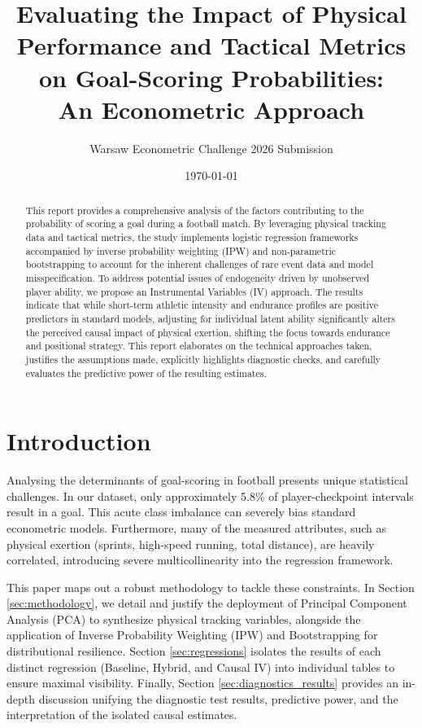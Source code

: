\documentclass[11pt, a4paper]{article}
\title{\textbf{Evaluating the Impact of Physical Performance and Tactical Metrics on Goal-Scoring Probabilities:\\ An Econometric Approach}}
\author{Warsaw Econometric Challenge 2026 Submission}
\date{\today}
\begin{document}
\maketitle

\begin{abstract}
This report provides a comprehensive analysis of the factors contributing to the probability of scoring a goal during a football match. By leveraging physical tracking data and tactical metrics, the study implements logistic regression frameworks accompanied by inverse probability weighting (IPW) and non-parametric bootstrapping to account for the inherent challenges of rare event data and model misspecification. To address potential issues of endogeneity driven by unobserved player ability, we propose an Instrumental Variables (IV) approach. The results indicate that while short-term athletic intensity and endurance profiles are positive predictors in standard models, adjusting for individual latent ability significantly alters the perceived causal impact of physical exertion, shifting the focus towards endurance and positional strategy. This report elaborates on the technical approaches taken, justifies the assumptions made, explicitly highlights diagnostic checks, and carefully evaluates the predictive power of the resulting estimates.
\end{abstract}

\section{Introduction}
Analysing the determinants of goal-scoring in football presents unique statistical challenges. In our dataset, only approximately 5.8\% of player-checkpoint intervals result in a goal. This acute class imbalance can severely bias standard econometric models. Furthermore, many of the measured attributes, such as physical exertion (sprints, high-speed running, total distance), are heavily correlated, introducing severe multicollinearity into the regression framework.

This paper maps out a robust methodology to tackle these constraints. In Section \ref{sec:methodology}, we detail and justify the deployment of Principal Component Analysis (PCA) to synthesize physical tracking variables, alongside the application of Inverse Probability Weighting (IPW) and Bootstrapping for distributional resilience. Section \ref{sec:regressions} isolates the results of each distinct regression (Baseline, Hybrid, and Causal IV) into individual tables to ensure maximal visibility. Finally, Section \ref{sec:diagnostics_results} provides an in-depth discussion unifying the diagnostic test results, predictive power, and the interpretation of the isolated causal estimates.
\end{document}
